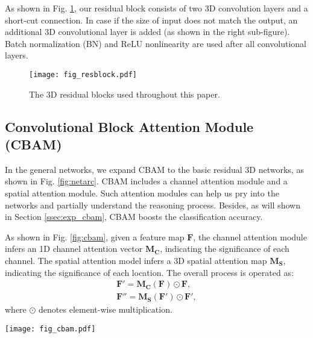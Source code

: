 \documentclass[final,5p,times,twocolumn]{elsarticle}
\begin{document}
As shown in Fig. \ref{fig:resblock}, our residual block consists of two 3D convolution layers and a short-cut connection. In case if the size of input does not match the output, an additional 3D convolutional layer is added (as shown in the right sub-figure). Batch normalization (BN) and ReLU nonlinearity are used after all convolutional layers. 


\begin{figure}
	\centering
	\texttt{[image: fig\_resblock.pdf]} \\
	\caption{The 3D residual blocks used throughout this paper.}
	\label{fig:resblock}
\end{figure}


\subsection{Convolutional Block Attention Module (CBAM)}
\label{ssec:cbam}
In the general networks, we expand CBAM \citep{Woo2018CBAM} to the basic residual 3D networks, as shown in Fig. \ref{fig:netarc}. CBAM includes a channel attention module and a spatial attention module. Such attention modules can help us pry into the networks and partially understand the reasoning process. Besides, as will shown in Section \ref{ssec:exp_cbam}, CBAM boosts the classification accuracy. 

As shown in Fig. \ref{fig:cbam}, given a feature map $\mathbf{F}$, the channel attention module infers an 1D channel attention vector $\mathbf{M_C}$, indicating the significance of each channel. The spatial attention model infers a 3D spatial attention map $\mathbf{M_S}$, indicating the significance of each location. The overall process is operated as:
\begin{equation}
\begin{aligned}
\mathbf{F}' = \mathbf{M_C}(\mathbf{F}) \odot \mathbf{F}, \\
\mathbf{F}'' = \mathbf{M_S}(\mathbf{F}') \odot \mathbf{F}',
\end{aligned}
\end{equation}
where $\odot$ denotes element-wise multiplication. 


\begin{figure*}
\centering
\texttt{[image: fig\_cbam.pdf]} \\
\caption{Pipeline of convolutional block attention module (CBAM) \citep{Woo2018CBAM}.}
\label{fig:cbam}
\end{figure*}
\end{document}
